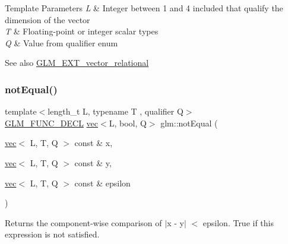 \begin{DoxyTemplParams}{Template Parameters}
{\em L} & Integer between 1 and 4 included that qualify the dimension of the vector \\
\hline
{\em T} & Floating-\/point or integer scalar types \\
\hline
{\em Q} & Value from qualifier enum\\
\hline
\end{DoxyTemplParams}
\begin{DoxySeeAlso}{See also}
\hyperlink{group__ext__vector__relational}{G\+L\+M\+\_\+\+E\+X\+T\+\_\+vector\+\_\+relational} 
\end{DoxySeeAlso}
\mbox{\label{group__ext__vector__relational_ga0497a636e5e8140bb7ebc021baf86637}} 
\subsubsection{\texorpdfstring{not\+Equal()}{notEqual()}\hspace{0.1cm}{\footnotesize\ttfamily [2/3]}}
{\footnotesize\ttfamily template$<$length\+\_\+t L, typename T , qualifier Q$>$ \\
\hyperlink{setup_8hpp_ab2d052de21a70539923e9bcbf6e83a51}{G\+L\+M\+\_\+\+F\+U\+N\+C\+\_\+\+D\+E\+CL} \hyperlink{structglm_1_1vec}{vec}$<$L, bool, Q$>$ glm\+::not\+Equal (\begin{DoxyParamCaption}\item[{\hyperlink{structglm_1_1vec}{vec}$<$ L, T, Q $>$ const \&}]{x,  }\item[{\hyperlink{structglm_1_1vec}{vec}$<$ L, T, Q $>$ const \&}]{y,  }\item[{\hyperlink{structglm_1_1vec}{vec}$<$ L, T, Q $>$ const \&}]{epsilon }\end{DoxyParamCaption})}

Returns the component-\/wise comparison of $\vert$x -\/ y$\vert$ $<$ epsilon. True if this expression is not satisfied.


